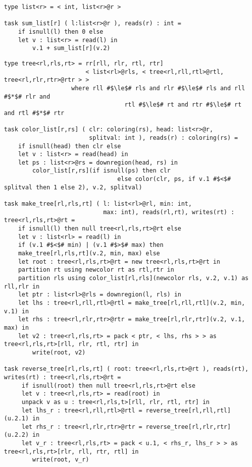 \begin{lstlisting}[label={lst:linkedlist},caption={Linked List Example}]
type list<r> = < int, list<r>@r >

task sum_list[r] ( l:list<r>@r ), reads(r) : int =
    if isnull(l) then 0 else
    let v : list<r> = read(l) in
        v.1 + sum_list[r](v.2)
\end{lstlisting}

\begin{lstlisting}[float={t},label={lst:treereverse},caption={Tree Partitioning and Reversal Example}]
type tree<rl,rls,rt> = rr[rll, rlr, rtl, rtr] 
                       < list<rl>@rls, < tree<rl,rll,rtl>@rtl, tree<rl,rlr,rtr>@rtr > >
     		       where rll #$\le$# rls and rlr #$\le$# rls and rll #$*$# rlr and 
                                  rtl #$\le$# rt and rtr #$\le$# rt  and rtl #$*$# rtr

task color_list[r,rs] ( clr: coloring(rs), head: list<r>@r, 
                        splitval: int ), reads(r) : coloring(rs) =
    if isnull(head) then clr else
    let v : list<r> = read(head) in
    let ps : list<r>@rs = downregion(head, rs) in
        color_list[r,rs](if isnull(ps) then clr 
                                else color(clr, ps, if v.1 #$<$# splitval then 1 else 2), v.2, splitval)

task make_tree[rl,rls,rt] ( l: list<rl>@rl, min: int, 
                            max: int), reads(rl,rt), writes(rt) : tree<rl,rls,rt>@rt =
    if isnull(l) then null tree<rl,rls,rt>@rt else 
    let v : list<rl> = read(l) in
    if (v.1 #$<$# min) | (v.1 #$>$# max) then
    make_tree[rl,rls,rt](v.2, min, max) else
    let root : tree<rl,rls,rt>@rt = new tree<rl,rls,rt>@rt in
    partition rt using newcolor rt as rtl,rtr in
    partition rls using color_list[rl,rls](newcolor rls, v.2, v.1) as rll,rlr in
    let ptr : list<rl>@rls = downregion(l, rls) in
    let lhs : tree<rl,rll,rtl>@rtl = make_tree[rl,rll,rtl](v.2, min, v.1) in
    let rhs : tree<rl,rlr,rtr>@rtr = make_tree[rl,rlr,rtr](v.2, v.1, max) in
    let v2 : tree<rl,rls,rt> = pack < ptr, < lhs, rhs > > as tree<rl,rls,rt>[rll, rlr, rtl, rtr] in
        write(root, v2)

task reverse_tree[rl,rls,rt] ( root: tree<rl,rls,rt>@rt ), reads(rt), writes(rt) : tree<rl,rls,rt>@rt =
     if isnull(root) then null tree<rl,rls,rt>@rt else
     let v : tree<rl,rls,rt> = read(root) in
     unpack v as u : tree<rl,rls,t>[rll, rlr, rtl, rtr] in
     let lhs_r : tree<rl,rll,rtl>@rtl = reverse_tree[rl,rll,rtl](u.2.1) in
     let rhs_r : tree<rl,rlr,rtr>@rtr = reverse_tree[rl,rlr,rtr](u.2.2) in
     let v_r : tree<rl,rls,rt> = pack < u.1, < rhs_r, lhs_r > > as tree<rl,rls,rt>[rlr, rll, rtr, rtl] in
        write(root, v_r)
\end{lstlisting}

